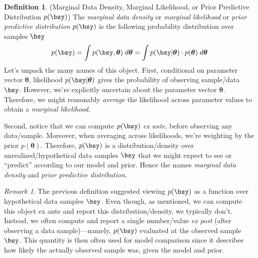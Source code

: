\documentclass[12pt]{article}
\theoremstyle{plain}
\theoremstyle{definition}
\newtheorem{defn}[thm]{Definition}
\theoremstyle{remark}
\newtheorem*{rmk}{Remark}
\newcommand{\bstheta}{\boldsymbol{\theta}}
\begin{document}
\begin{defn}
\label{defn:marginallikelihood}
(Marginal Data Density, Marginal Likelihood, or Prior Predictive
Distribution $p(\bsy)$)
The \emph{marginal data density} or \emph{marginal likelihood} or
\emph{prior predictive distribution} $p(\bsy)$ is the following
probability distribution over samples $\bsy$
\begin{equation}
  p(\bsy) = \int p(\bsy, \bstheta) \; d\bstheta =
  \int p(\bsy | \bstheta) \cdot p(\bstheta) \; d\bstheta
  \label{marglik}
\end{equation}
Let's unpack the many names of this object.
First, conditional on parameter vector $\bstheta$, likelihood
$p(\bsy|\bstheta)$ gives the probability of observing sample/data
$\bsy$.  However, we're explicitly uncertain about the parameter
vector $\bstheta$. Therefore, we might reasonably \emph{average} the
likelihood across parameter values to obtain a
\emph{marginal likelihood}.

Second, notice that we can compute $p(\bsy)$ \emph{ex ante},
before observing any data/sample. Moreover, when averaging across
likelihoods, we're weighting by the prior $p(\bstheta)$.
Therefore, $p(\bsy)$ is a distribution/density over
unrealized/hypothetical data samples $\bsy$ that we might expect
to see or ``predict'' according to our model and prior. Hence the names
\emph{marginal data density} and \emph{prior predictive distribution}.
\end{defn}

\begin{rmk}
The previous definition suggested viewing $p(\bsy)$ as a function
over hypothetical data samples $\bsy$. Even though, as mentioned,
we can compute this object ex ante and report this distribution/density,
we typically don't. Instead, we often compute and report a single
number/value \emph{ex post} (after observing a data sample)---namely,
$p(\bsy)$ evaluated at the observed sample $\bsy$.
This quantity is then often used for model comparison since it describes
how likely the actually observed sample was, given the model and prior.
\end{rmk}
\end{document}

